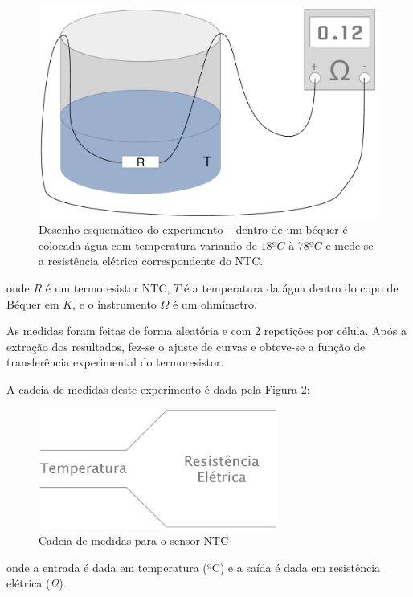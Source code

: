 \documentclass[a4paper]{instrumentacao}
\begin{document}
\begin{figure}[H]
\center
\includegraphics[width=\textwidth]{Bequer.pdf}
\caption{Desenho esquemático do experimento -- dentro de um béquer é colocada água com temperatura variando de $18ºC$ à $78ºC$ e mede-se a resistência elétrica correspondente do NTC.}
\label{fig:ntc-esquematico}
\end{figure}

\noindent
onde $R$ é um termoresistor NTC, $T$ é a temperatura da água dentro do copo de Béquer em $K$, e o instrumento $\Omega$ é um ohmímetro.

As medidas foram feitas de forma aleatória e com 2 repetições por célula. Após a extração dos resultados, fez-se o ajuste de curvas e obteve-se a função de transferência experimental do termoresistor.

A cadeia de medidas deste experimento é dada pela Figura \ref{fig:ntc-cadeia-medidas}:

\begin{figure}[H]
\center
\includegraphics[width=0.7\textwidth]{CadeiaMedidas.pdf}
\caption{Cadeia de medidas para o sensor NTC}
\label{fig:ntc-cadeia-medidas}
\end{figure}

\noindent
onde a entrada é dada em temperatura (ºC) e a saída é dada em resistência elétrica ($\Omega$).
\end{document}
